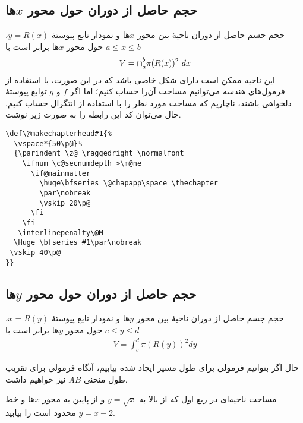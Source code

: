 \subsection{حجم حاصل از دوران حول محور $x$ها}
حجم جسم حاصل از دوران ناحیهٔ بین محور $x$ها و  نمودار تابع پیوستهٔ $y=R(x)$،
$a\leq x\leq b$
 حول محور $x$ها برابر است با
 \begin{align}\label{10eq1}
 V=\mathbin{\mathstrut{\cap}}_a^b \pi (R(x))^2 \ d x
 \end{align}
  این 
ناحیه ممکن است  دارای شکل خاصی باشد که در این صورت، با استفاده از فرمول‌های  هندسه می‌توانیم مساحت آن‌را حساب کنیم؛ اما اگر $f$ و $g$ توابع پیوستهٔ 
دلخواهی باشند، ناچاریم که مساحت مورد نظر را با استفاده از انتگرال حساب کنیم. 
 حال می‌توان کد این رابطه را به صورت زیر نوشت.
\begin{lstlisting}[caption={محاسبه حجم جسم حاصل از دوران},
label={code1}
]  
\def\@makechapterhead#1{%
  \vspace*{50\p@}%
  {\parindent \z@ \raggedright \normalfont
    \ifnum \c@secnumdepth >\m@ne
      \if@mainmatter
        \huge\bfseries \@chapapp\space \thechapter
        \par\nobreak
        \vskip 20\p@
      \fi
    \fi
   \interlinepenalty\@M
  \Huge \bfseries #1\par\nobreak
 \vskip 40\p@
}}                                           
\end{lstlisting} 
\subsection{حجم حاصل از دوران حول محور $y$ها}
حجم جسم حاصل از دوران ناحیهٔ بین محور $y$ها و  نمودار تابع پیوستهٔ $x=R(y)$،
$c\leq y\leq d$
 حول محور $y$ها برابر است با
 \begin{align}\label{10eq2}
 V=\int_c^d \pi (R(y))^2 dy
 \end{align}

 حال اگر بتوانیم فرمولی برای طول مسیر ایجاد شده بیابیم، آنگاه فرمولی برای تقریب طول منحنی $AB$ نیز خواهیم داشت. 


 
 
\begin{example}
مساحت ناحیه‌ای در ربع اول که از بالا به $y=\sqrt{x}$ و از پایین به محور $x$ها
و خط $y=x-2$ محدود است را بیابید. 
\end{example}

